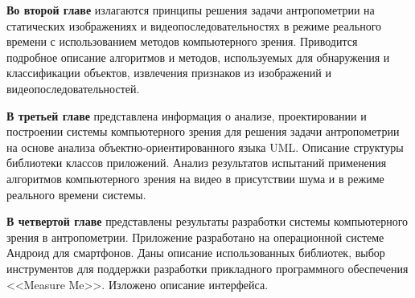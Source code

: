 \textbf{Во второй главе} излагаются принципы решения задачи антропометрии на статических изображениях и видеопоследовательностях в режиме реального времени с использованием методов компьютерного зрения. Приводится подробное описание алгоритмов и методов, используемых для обнаружения и классификации объектов, извлечения признаков из изображений и видеопоследовательностей.

\textbf{В третьей главе} представлена информация о анализе, проектировании и построении системы компьютерного зрения для решения задачи антропометрии на основе анализа объектно-ориентированного языка UML. Описание структуры библиотеки классов приложений. Анализ результатов испытаний применения алгоритмов компьютерного зрения на видео в присутствии шума и в режиме реального времени системы.

\textbf{В четвертой главе} представлены результаты разработки системы компьютерного зрения в антропометрии. Приложение разработано на операционной системе Андроид для смартфонов. Даны описание использованных библиотек, выбор инструментов для поддержки разработки прикладного программного обеспечения <<Measure Me>>. Изложено описание интерфейса.

